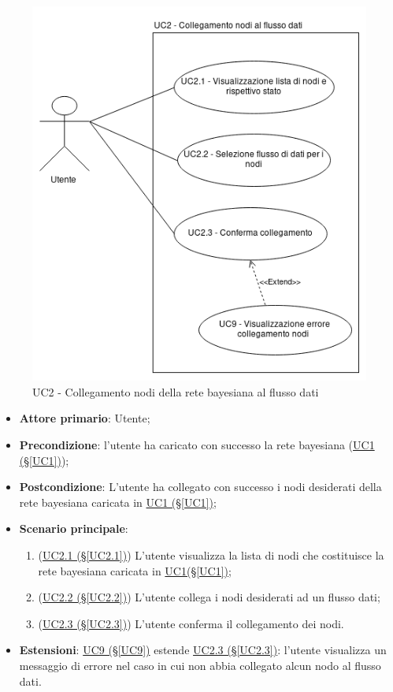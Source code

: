 \begin{figure}[H]
\centering
\includegraphics[scale=0.5]{./images/UC2.png}
\caption{UC2 - Collegamento nodi della rete bayesiana al flusso dati}
\end{figure}

\begin{itemize}
\item \textbf{Attore primario}: Utente;
\item \textbf{Precondizione}: l'utente ha caricato con successo la rete bayesiana (\hyperref[UC1]{UC1 (§\ref*{UC1})});
\item \textbf{Postcondizione}: L'utente ha collegato con successo i nodi desiderati della rete bayesiana caricata in \hyperref[UC1]{UC1 (§\ref*{UC1})};
\item \textbf{Scenario principale}:
	\begin{enumerate}
	\item (\hyperref[UC2.1]{UC2.1 (§\ref*{UC2.1})}) L'utente visualizza la lista di nodi che costituisce la rete bayesiana caricata in \hyperref[UC1]{UC1(§\ref*{UC1})};
	\item (\hyperref[UC2.2]{UC2.2 (§\ref*{UC2.2})}) L'utente collega i nodi desiderati ad un flusso dati;
	\item (\hyperref[UC2.3]{UC2.3 (§\ref*{UC2.3})}) L'utente conferma il collegamento dei nodi.
	\end{enumerate}
\item \textbf{Estensioni}: \hyperref[UC9]{UC9 (§\ref*{UC9})} estende \hyperref[UC2.3]{UC2.3 (§\ref*{UC2.3})}: l'utente visualizza un messaggio di errore nel caso in cui non abbia collegato alcun nodo al flusso dati.
\end{itemize}

